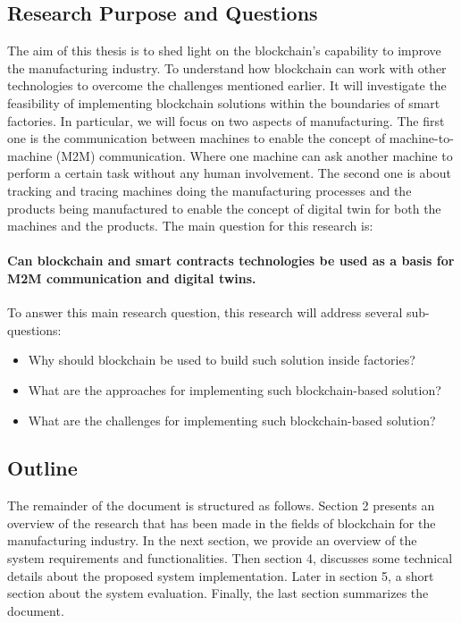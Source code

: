 \documentclass[runningheads]{llncs}
\begin{document}
\subsection{Research Purpose and Questions}
The aim of this thesis is to shed light on the blockchain’s capability to improve the manufacturing industry. To understand how blockchain can work with other technologies to overcome the challenges mentioned earlier. It will investigate the feasibility of implementing blockchain solutions within the boundaries of smart factories.  In particular, we will focus on two aspects of manufacturing. The first one is the communication between machines to enable the concept of machine-to-machine (M2M) communication. Where one machine can ask another machine to perform a certain task without any human involvement.  The second one is about tracking and tracing machines doing the manufacturing processes and the products being manufactured to enable the concept of digital twin for both the machines and the products. The main question for this research is:

\paragraph{Can blockchain and smart contracts technologies be used as a basis for M2M communication and digital twins.} To answer this main research question, this research will address several sub-questions:
\begin{itemize}
  \item Why should blockchain be used to build such solution inside factories?
  \item What are the approaches for implementing such blockchain-based solution? 
  \item What are the challenges for implementing such blockchain-based solution? 
\end{itemize}

\subsection{Outline}
The remainder of the document is structured as follows. Section 2 presents an overview of the research that has been made in the fields of blockchain for the manufacturing industry. In the next section, we provide an overview of the system requirements and functionalities. Then section 4, discusses some technical details about the proposed system implementation. Later in section 5, a short section about the system evaluation. Finally, the last section summarizes the document. 
\end{document}
